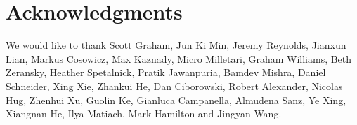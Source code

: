 \section*{Acknowledgments}
We would like to thank Scott Graham, Jun Ki Min, Jeremy Reynolds, Jianxun Lian, 
Markus Cosowicz, Max Kaznady, Micro Milletari, Graham Williams, Beth Zeransky, 
Heather Spetalnick, Pratik Jawanpuria, Bamdev Mishra, Daniel Schneider, Xing Xie,
Zhankui He, Dan Ciborowski, Robert Alexander, Nicolas Hug, Zhenhui Xu, Guolin Ke, 
Gianluca Campanella, Almudena Sanz, Ye Xing, Xiangnan He, Ilya Matiach, 
Mark Hamilton and Jingyan Wang.

